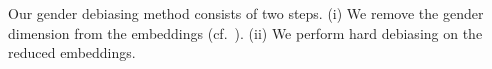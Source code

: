 \documentclass[11pt,a4paper]{article}
\begin{document}





Our gender debiasing method consists of two steps.
(i) We remove the gender dimension from the embeddings
(cf.\ \citep{dufter19ultraDense}). (ii)
We perform hard debiasing
\citep{bolukbasi16debiasing} on the reduced
embeddings.

\end{document}
